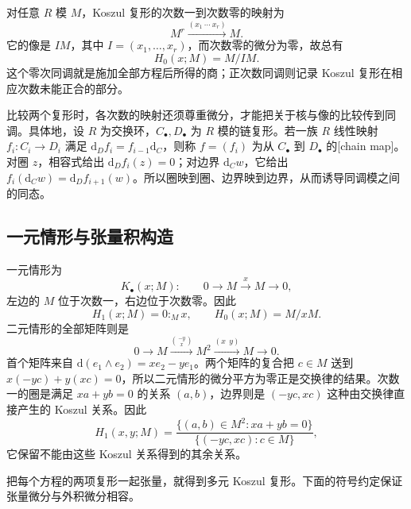 对任意 \(R\) 模 \(M\)，Koszul 复形的次数一到次数零的映射为
\[
	M^r\xrightarrow{(x_1\ \cdots\ x_r)}M.
\]
它的像是 \(IM\)，其中 \(I=(x_1,\ldots,x_r)\)，而次数零的微分为零，故总有
\[
	H_0(x;M)=M/IM.
\]
这个零次同调就是施加全部方程后所得的商；正次数同调则记录 Koszul 复形在相应次数未能正合的部分。

\ProseParagraphBreak
比较两个复形时，各次数的映射还须尊重微分，才能把关于核与像的比较传到同调。具体地，设 \(R\) 为交换环，\(C_\bullet,D_\bullet\) 为 \(R\) 模的链复形。若一族 \(R\) 线性映射 \(f_i:C_i\to D_i\) 满足 \(\mathrm{d}_Df_i=f_{i-1}\mathrm{d}_C\)，则称 \(f=(f_i)\) 为从 \(C_\bullet\) 到 \(D_\bullet\) 的[chain map]。对圈 \(z\)，相容式给出 \(\mathrm{d}_Df_i(z)=0\)；对边界 \(\mathrm{d}_Cw\)，它给出 \(f_i(\mathrm{d}_Cw)=\mathrm{d}_Df_{i+1}(w)\)。所以圈映到圈、边界映到边界，从而诱导同调模之间的同态。

\subsection{一元情形与张量积构造}
\label{b3:subsec:1502:02}

一元情形为
\[
	K_\bullet(x;M):\qquad 0\longrightarrow M\xrightarrow{x}M\longrightarrow0,
\]
左边的 \(M\) 位于次数一，右边位于次数零。因此
\[
	H_1(x;M)=0:_Mx,\qquad H_0(x;M)=M/xM.
\]
二元情形的全部矩阵则是
\[
	0\longrightarrow M\xrightarrow{\binom{-y}{x}}M^2 \xrightarrow{(x\ \ y)}M\longrightarrow0.
\]
首个矩阵来自 \(\mathrm{d}(e_1\wedge e_2)=xe_2-ye_1\)。两个矩阵的复合把 \(c\in M\) 送到 \(x(-yc)+y(xc)=0\)，所以二元情形的微分平方为零正是交换律的结果。次数一的圈是满足 \(xa+yb=0\) 的关系 \((a,b)\)，边界则是 \((-yc,xc)\) 这种由交换律直接产生的 Koszul 关系。因此
\[
	H_1(x,y;M) =\frac{\{(a,b)\in M^2:xa+yb=0\}} {\{(-yc,xc):c\in M\}},
\]
它保留不能由这些 Koszul 关系得到的其余关系。

把每个方程的两项复形一起张量，就得到多元 Koszul 复形。下面的符号约定保证张量微分与外积微分相容。

